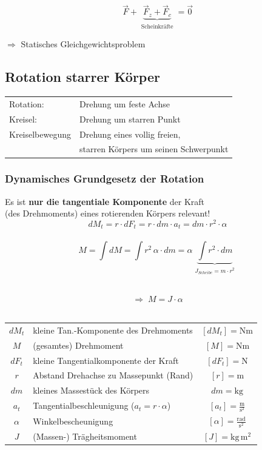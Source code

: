 	$$ \boxed{ \vec{F} + \underbrace{ \vec{F}_z + \vec{F}_c }_{\substack{\text{Scheinkräfte}}} = \vec{0} }$$ 
	
	$\Rightarrow$ Statisches Gleichgewichtsproblem
	
	
	\vfill\null
	\columnbreak
	
	
	
	
	
	\subsection{Rotation starrer Körper}
	
	\begin{tabular}{ll}
	Rotation: & Drehung um feste Achse \\
	Kreisel: & Drehung um starren Punkt \\
	Kreiselbewegung & Drehung eines vollig freien, \\
	&  starren Körpers um seinen Schwerpunkt \\
	\end{tabular}
	
	
	
	\subsubsection{Dynamisches Grundgesetz der Rotation}
	Es ist \textbf{nur die tangentiale Komponente} der Kraft \\
   (des Drehmoments) eines rotierenden Körpers relevant! \\
	
	
	$$dM_t = r \cdot dF_t = r \cdot dm \cdot a_t = dm \cdot r^2 \cdot \alpha$$ \\
	
	$$ \boxed{ M = \int dM = \int r^2 \, \alpha \cdot dm = \alpha  \underbrace{  \int r^2 \cdot dm }_{\substack{J_{Scheibe} = m \cdot r^2}} }$$ \
	
	$$ \boxed{ \Rightarrow \; M = J \cdot \alpha} $$ \\
	
	
	\begin{tabular}{c l c}
	$dM_t$ & kleine Tan.-Komponente des Drehmoments & $[dM_t] = \mathrm{Nm}$ \\
	$M$ & (gesamtes) Drehmoment & $[M] = \mathrm{Nm}$ \\
	$dF_t$ & kleine Tangentialkomponente der Kraft & $[dF_t] = \mathrm{N}$ \\
	$r$ & Abstand Drehachse zu Massepunkt (Rand) & $[r] = \mathrm{m}$ \\
	$dm$ & kleines Massestück des Körpers & $dm = \mathrm{kg}$ \\
	$a_t$ & Tangentialbeschleunigung ($a_t = r \cdot \alpha$) & $[a_t] = \mathrm{\frac{m}{s^2}}$ \\
	$\alpha$ & Winkelbescheunigung & $[\alpha] = \mathrm{\frac{rad}{s^2}}$ \\
	$J$ & (Massen-) Trägheitsmoment & $[J] = \mathrm{kg \, m^2}$ \\
	\end{tabular}
	
